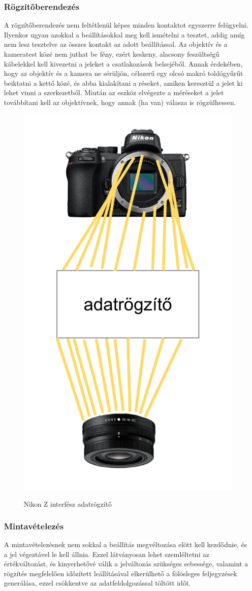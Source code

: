 \subsubsection{Rögzítőberendezés}
A rögzítőberendezés nem feltétlenül képes minden kontaktot egyszerre felügyelni. Ilyenkor ugyan azokkal a beállításokkal meg kell ismételni a tesztet, addig amíg nem lesz tesztelve az összes kontakt az adott beállítással. Az objektív és a kameratest közé nem juthat be fény, ezért keskeny, alacsony feszültségű kábelekkel kell kivezetni a jeleket a csatlakozások belsejéből. Annak érdekében, hogy az objektív és a kamera ne sérüljön, célszerű egy olcsó makró toldógyűrűt beiktatni a kettő közé, és abba kialakítani a réseket, amiken keresztül a jelet ki lehet vinni a szerkezetből. Miután az eszköz elvégezte a méréseket a jelet továbbítani kell az objektívnek, hogy annak (ha van) válasza is rögzülhessen.
\begin{figure}[H]
	\centering
	\includegraphics[width=0.5\linewidth]{img/arduino.drawio.png}
    \cite{Nikon_Z}\cite{Nikon_Z_16-50}
	\caption{Nikon Z interfész adatrögzítő}
	\label{fig:rogzito}
\end{figure}
\subsubsection{Mintavételezés}
A mintavételezésnek nem sokkal a beállítás megvéltozása elött kell kezdődnie, és a jel végeztável le kell állnia. Ezzel látványosan lehet szemléltetni az értékváltozást, és kinyerhetővé válik a jelváltozás szükséges sebessége, valamint a rögzítés megfelelően időzített leállításával elkerülhető a fölösleges feljegyzések generálása, ezzel csökkentve az adatfeldolgozással töltött időt.
